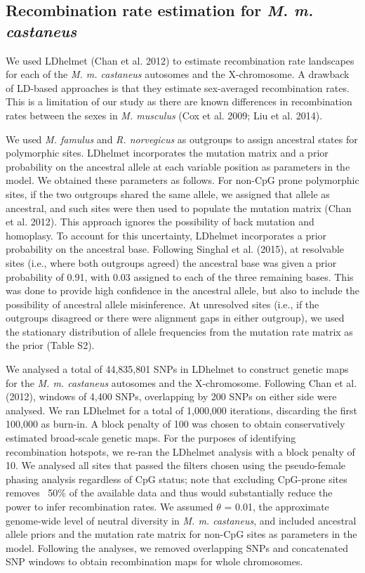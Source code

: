 \subsection{Recombination rate estimation for \textit{\textit{M. m. castaneus}}}
        	
         We used LDhelmet (Chan et al. 2012) to estimate recombination rate landscapes for each of the \textit{M. m. castaneus} autosomes and the X-chromosome. A drawback of LD-based approaches is that they estimate sex-averaged recombination rates. This is a limitation of our study as there are known differences in recombination rates between the sexes in \textit{M. musculus} (Cox et al. 2009; Liu et al. 2014).
 
        	We used \textit{M. famulus} and \textit{R. norvegicus} as outgroups to assign ancestral states for polymorphic sites. LDhelmet incorporates the mutation matrix and a prior probability on the ancestral allele at each variable position as parameters in the model. We obtained these parameters as follows. For non-CpG prone polymorphic sites, if the two outgroups shared the same allele, we assigned that allele as ancestral, and such sites were then used to populate the mutation matrix (Chan et al. 2012). This approach ignores the possibility of back mutation and homoplasy. To account for this uncertainty, LDhelmet incorporates a prior probability on the ancestral base. Following Singhal et al. (2015), at resolvable sites (i.e., where both outgroups agreed) the ancestral base was given a prior probability of 0.91, with 0.03 assigned to each of the three remaining bases. This was done to provide high confidence in the ancestral allele, but also to include the possibility of ancestral allele misinference. At unresolved sites (i.e., if the outgroups disagreed or there were alignment gaps in either outgroup), we used the stationary distribution of allele frequencies from the mutation rate matrix as the prior (Table S2).
 
We analysed a total of 44,835,801 SNPs in LDhelmet to construct genetic maps for the \textit{M. m. castaneus} autosomes and the X-chromosome. Following Chan et al. (2012), windows of 4,400 SNPs, overlapping by 200 SNPs on either side were analysed. We ran LDhelmet for a total of 1,000,000 iterations, discarding the first 100,000 as burn-in. A block penalty of 100 was chosen to obtain conservatively estimated broad-scale genetic maps. For the purposes of identifying recombination hotspots, we re-ran the LDhelmet analysis with a block penalty of 10. We analysed all sites that passed the filters chosen using the pseudo-female phasing analysis regardless of CpG status; note that excluding CpG-prone sites removes ~50\% of the available data and thus would substantially reduce the power to infer recombination rates. We assumed $\theta$ = 0.01, the approximate genome-wide level of neutral diversity in \textit{M. m. castaneus}, and included ancestral allele priors and the mutation rate matrix for non-CpG sites as parameters in the model. Following the analyses, we removed overlapping SNPs and concatenated SNP windows to obtain recombination maps for whole chromosomes. 

